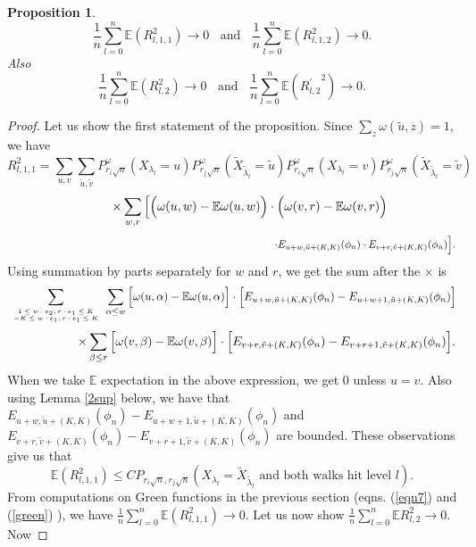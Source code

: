 \documentclass[11pt]{amsart}
\newtheorem{proposition}[theorem]{\sc Proposition}
\begin{document}
\begin{proposition}
\label{prop3}
\[ \frac{1}{n} \sum_{l=0}^n \mathbb{E}(R_{l,1,1}^2) \longrightarrow 0 \;\; \mbox{ and  } \;\;\frac{1}{n} \sum_{l=0}^n \mathbb{E}(R_{l,1,2}^2) \longrightarrow 0 .\]
Also
\[ \frac{1}{n}  \sum_{l=0}^n \mathbb{E}(R_{l,2}^2) \longrightarrow 0 \;\;\mbox{ and }\;\; \frac{1}{n}  \sum_{l=0}^n \mathbb{E}({R_{l,2}^{'}}^2) \longrightarrow 0.\]
\end{proposition}
\begin{proof}Let us show the first statement of the proposition. Since $\sum_z \omega(\tilde{u},z) = 1$, we have
\[R_{l,1,1}^2= \sum_{u,v}\sum_{\tilde{u},\tilde{v}}P_{r_i \sqrt{n}}^{\omega}(X_{\lambda_l}=u)P_{r_j \sqrt{n}}^{\omega}(\tilde{X}_{\tilde{\lambda}_l}=\tilde{u})P_{r_i \sqrt{n}}^{\omega}(X_{\lambda_l}=v)P_{r_j \sqrt{n}} ^{\omega}(\tilde{X}_{\tilde{\lambda}_l}=\tilde{v})\hspace{4cm}\]
\[ \hspace{1cm}\times\sum_{w,r}\Big{[}\Big{(} \omega(u,w) - \mathbb{E}\omega(u,w)\Big{)}\cdot \Big{(} \omega(v,r) - \mathbb{E}\omega(v,r)\Big{)} \] \[ \hspace{9cm} \cdot E_{u+w,\tilde{u}+(K,K)}(\phi_n)\cdot E_{v+r,\tilde{v}+(K,K)}(\phi_n)\Big{]}.\]
Using summation by parts separately for $w$ and $r$, we get the sum after the $\times$ is 
\[\sum_{  \begin{tiny} \begin{array}{c}1\le  w\cdot e_2, r\cdot e_1  \leq K \\
 -K \le  w\cdot e_1 , r\cdot e_1  \leq K  \end{array}\end{tiny}} \sum_{\alpha \le w} \Big{[}\omega(u,\alpha)- \mathbb{E}\omega(u,\alpha)\Big{]}\cdot \Big{[} E_{u+w,\tilde{u}+(K,K)}(\phi_n)-E_{u+w+1,\tilde{u}+(K,K)}(\phi_n)\Big{]}\]
\[ \hspace{2cm} \times  \sum_{\beta \le r} \Big{[}\omega(v,\beta)- \mathbb{E}\omega(v,\beta)\Big{]}\cdot \Big{[} E_{v+r,\tilde{v}+(K,K)}(\phi_n)-E_{v+r+1,\tilde{v}+(K,K)}(\phi_n)\Big{]}.\]
When we take $\mathbb{E}$ expectation in the above expression, we get $0$ unless $u=v$. Also using Lemma \ref{2sup} below, we have that $E_{u+w,\tilde{u}+(K,K)}(\phi_n)-E_{u+w+1,\tilde{u}+(K,K)}(\phi_n)$ and 
$E_{v+r,\tilde{v}+(K,K)}(\phi_n)-E_{v+r+1,\tilde{v}+(K,K)}(\phi_n)$ are bounded. These observations give us that 
\[ \mathbb{E}(R_{l,1,1}^2) \le C P_{r_i \sqrt{n},r_j \sqrt{n}}(X_{\lambda_l}= \tilde{X}_{\tilde{\lambda}_l} \mbox{ and both walks hit level } l). \]
From computations on Green functions in the previous section (eqns. (\ref{eqn7}) and (\ref{green}) ), we have $\frac{1}{n} \sum_{l=0}^n \mathbb{E}(R_{l,1,1}^2) \to 0$. Let us now show \begin{math} \frac{1}{n}\sum_{l=0}^n \mathbb{E} R_{l,2}^2  \to 0 \end{math}. Now

\end{proof}
\end{document}
